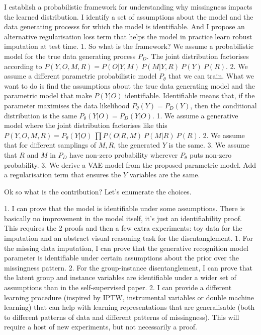 \documentclass[a4paper,12pt,twoside,openright]{report}
\begin{document}
I establish a probabilistic framework for understanding why missingness impacts the learned distribution. I identify a set of assumptions about the model and the data generating processs for which the model is identifiable. And I propose an alternative regularisation loss term that helps the model in practice learn robust imputation at test time.
    1. So what is the framework? We assume a probabilistic model for the true data generating process $P_D$. The joint distribution factorises according to $P(Y, O, M, R) = P(O | Y, M) ~ P(M | Y, R) ~ P(Y) ~ P(R)$.
    2. We assume a different parametric probabilistic model $P_\theta$ that we can train. What we want to do is find the assumptions about the true data generating model and the parametric model that make $P(Y | O)$ identifiable. Identifiable means that, if the parameter maximises the data likelihood $P_\theta (Y) = P_D (Y)$, then the conditional distribution is the same $P_\theta (Y | O) = P_D (Y | O)$.
        1. We assume a generative model where the joint distribution factorises like this $P (Y, O, M, R) = P_\theta (Y | \underline{O}) ~ \prod P(O | R, M) ~ P(M | R) ~ P(R)$.
        2. We assume that for different samplings of $M, R$, the generated $Y$ is the same.
        3. We assume that $R$ and $M$ in $P_D$ have non-zero probability wherever $P_\theta$ puts non-zero probability.
    3. We derive a VAE model from the proposed parametric model. Add a regularisation term that ensures the $Y$ variables are the same. 

Ok so what is the contribution? Let's enumerate the choices.

1. I can prove that the model is identifiable under some assumptions. There is basically no improvement in the model itself, it's just an identifiability proof. This requires the 2 proofs and then a few extra experiments: toy data for the imputation and an abstract visual reasoning task for the disentanglement.
    1. For the missing data imputation, I can prove that the generative recognition model parameter is identifiable under certain assumptions about the prior over the missingness pattern.
    2. For the group-instance disentanglement, I can prove that the latent group and instance variables are identifiable under a wider set of assumptions than in the self-supervised paper.
2. I can provide a different learning procedure (inspired by IPTW, instrumental variables or double machine learning) that can help with learning representations that are generalisable (both to different patterns of data and different patterns of missingness). This will require a host of new experiments, but not necessarily a proof.
\end{document}
